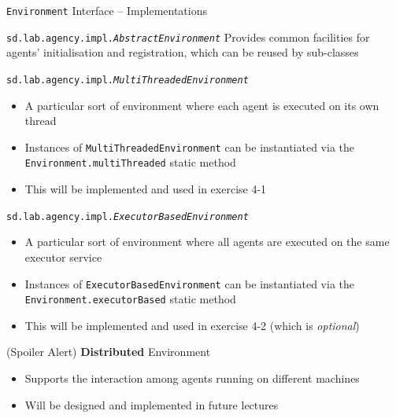 \documentclass[presentation]{beamer}\mode<presentation>{\usetheme{AMSCesenaPurpleAndGold}}
\newcommand{\labN}{4}
\begin{document}
\begin{frame}[allowframebreaks]{\texttt{Environment} Interface -- Implementations}
    
    \begin{block}{\texttt{sd.lab.agency.impl.\textit{AbstractEnvironment}}}
        Provides common facilities for agents' initialisation and registration, which can be reused by sub-classes
    \end{block}
    
    \bigskip
    
    \begin{exampleblock}{\texttt{sd.lab.agency.impl.\textit{MultiThreadedEnvironment}}}
        \begin{itemize}
			\item A particular sort of environment where each agent is executed on its own thread
			\item Instances of \texttt{MultiThreadedEnvironment} can be instantiated via the \alert{\texttt{Environment.multiThreaded}} static method
			\item This will be implemented and used in exercise \labN{}-1
        \end{itemize}
    \end{exampleblock}

	\bigskip

	\begin{exampleblock}{\texttt{sd.lab.agency.impl.\textit{ExecutorBasedEnvironment}}}
		\begin{itemize}
			\item A particular sort of environment where all agents are executed on the same executor service
			\item Instances of \texttt{ExecutorBasedEnvironment} can be instantiated via the \alert{\texttt{Environment.executorBased}} static method
			\item This will be implemented and used in exercise \labN{}-2 (which is \emph{optional})
		\end{itemize}
	\end{exampleblock}
    
    \bigskip
    
    \begin{alertblock}{(Spoiler Alert) \textbf{Distributed} Environment}
        \begin{itemize}
        	\item Supports the interaction among agents running on different machines
        	\item Will be designed and implemented in future lectures
        \end{itemize}
    \end{alertblock}
    
\end{frame}
\end{document}
